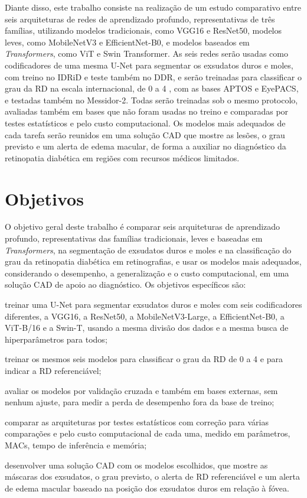 Diante disso, este trabalho consiste na realização de um estudo comparativo entre seis arquiteturas de redes de aprendizado profundo, representativas de três famílias, utilizando modelos tradicionais, como VGG16 e ResNet50, modelos leves, como MobileNetV3 e EfficientNet-B0, e modelos baseados em \textit{Transformers}, como ViT e Swin Transformer. As seis redes serão usadas como codificadores de uma mesma U-Net para segmentar os exsudatos duros e moles, com treino no IDRiD e teste também no DDR, e serão treinadas para classificar o grau da RD na escala internacional, de 0 a 4 \cite{wilkinson2003icdr}, com as bases APTOS e EyePACS, e testadas também no Messidor-2. Todas serão treinadas sob o mesmo protocolo, avaliadas também em bases que não foram usadas no treino e comparadas por testes estatísticos e pelo custo computacional. Os modelos mais adequados de cada tarefa serão reunidos em uma solução CAD que mostre as lesões, o grau previsto e um alerta de edema macular, de forma a auxiliar no diagnóstico da retinopatia diabética em regiões com recursos médicos limitados.

\section{Objetivos}
\label{sec:objetivos}

O objetivo geral deste trabalho é comparar seis arquiteturas de aprendizado profundo, representativas das famílias tradicionais, leves e baseadas em \textit{Transformers}, na segmentação de exsudatos duros e moles e na classificação do grau da retinopatia diabética em retinografias, e usar os modelos mais adequados, considerando o desempenho, a generalização e o custo computacional, em uma solução CAD de apoio ao diagnóstico. Os objetivos específicos são:

\begin{alineas}
	\item treinar uma U-Net para segmentar exsudatos duros e moles com seis codificadores diferentes, a VGG16, a ResNet50, a MobileNetV3-Large, a EfficientNet-B0, a ViT-B/16 e a Swin-T, usando a mesma divisão dos dados e a mesma busca de hiperparâmetros para todos;
	\item treinar os mesmos seis modelos para classificar o grau da RD de 0 a 4 e para indicar a RD referenciável;
	\item avaliar os modelos por validação cruzada e também em bases externas, sem nenhum ajuste, para medir a perda de desempenho fora da base de treino;
	\item comparar as arquiteturas por testes estatísticos com correção para várias comparações e pelo custo computacional de cada uma, medido em parâmetros, MACs, tempo de inferência e memória;
	\item desenvolver uma solução CAD com os modelos escolhidos, que mostre as máscaras dos exsudatos, o grau previsto, o alerta de RD referenciável e um alerta de edema macular baseado na posição dos exsudatos duros em relação à fóvea.
\end{alineas}


